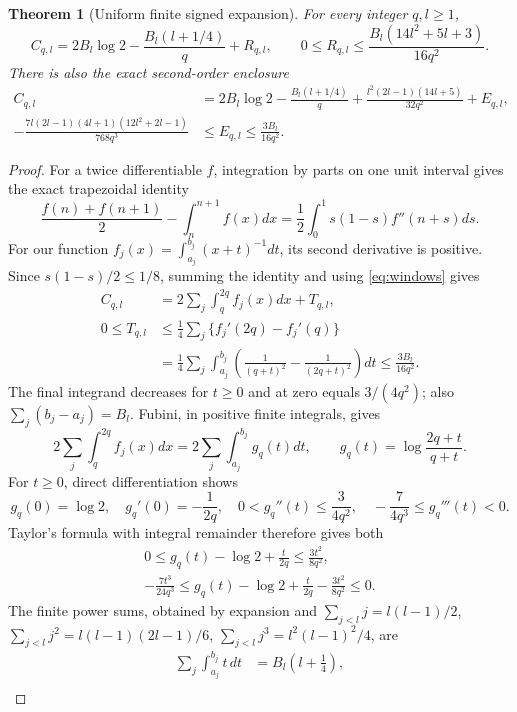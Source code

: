 \documentclass[11pt,a4paper]{article}
\newtheorem{theorem}{Theorem}
\begin{document}
\begin{theorem}[Uniform finite signed expansion]\label{thm:expansion}
For every integer $q,l\ge1$,
\begin{equation}\label{eq:first}
 C_{q,l}=2B_l\log2-\frac{B_l(l+1/4)}q+R_{q,l},\qquad
 0\le R_{q,l}\le\frac{B_l(14l^2+5l+3)}{16q^2}.
\end{equation}
There is also the exact second-order enclosure
\begin{align}
 C_{q,l}
 &=2B_l\log2-\frac{B_l(l+1/4)}q
  +\frac{l^2(2l-1)(14l+5)}{32q^2}+E_{q,l},\label{eq:second}\\
 -\frac{7l(2l-1)(4l+1)(12l^2+2l-1)}{768q^3}
 &\le E_{q,l}\le\frac{3B_l}{16q^2}.\label{eq:error}
\end{align}
\end{theorem}
\begin{proof}
For a twice differentiable $f$, integration by parts on one unit interval
gives the exact trapezoidal identity
\[
 \frac{f(n)+f(n+1)}2-\int_n^{n+1}f(x)dx
 =\frac12\int_0^1s(1-s)f''(n+s)ds.
\]
For our function
$f_j(x)=\int_{a_j}^{b_j}(x+t)^{-1}dt$, its second derivative is positive.
Since $s(1-s)/2\le1/8$, summing the identity and using
\eqref{eq:windows} gives
\begin{align*}
 C_{q,l}&=2\sum_j\int_q^{2q}f_j(x)dx+T_{q,l},\\
 0\le T_{q,l}
 &\le\frac14\sum_j\{f_j'(2q)-f_j'(q)\}\\
 &=\frac14\sum_j\int_{a_j}^{b_j}
                  \left(\frac1{(q+t)^2}-\frac1{(2q+t)^2}\right)dt
 \le\frac{3B_l}{16q^2}.
\end{align*}
The final integrand decreases for $t\ge0$ and at zero equals $3/(4q^2)$;
also $\sum_j(b_j-a_j)=B_l$. Fubini, in positive finite integrals, gives
\[
 2\sum_j\int_q^{2q}f_j(x)dx
 =2\sum_j\int_{a_j}^{b_j}g_q(t)dt,
 \qquad g_q(t)=\log\frac{2q+t}{q+t}.
\]
For $t\ge0$, direct differentiation shows
\[
 g_q(0)=\log2,\quad g_q'(0)=-\frac1{2q},\quad
 0<g_q''(t)\le\frac3{4q^2},\quad
 -\frac7{4q^3}\le g_q'''(t)<0.
\]
Taylor's formula with integral remainder therefore gives both
\begin{gather*}
 0\le g_q(t)-\log2+\frac{t}{2q}\le\frac{3t^2}{8q^2},\\
 -\frac{7t^3}{24q^3}
 \le g_q(t)-\log2+\frac{t}{2q}-\frac{3t^2}{8q^2}\le0.
\end{gather*}
The finite power sums, obtained by expansion and
$\sum_{j<l}j=l(l-1)/2$, $\sum_{j<l}j^2=l(l-1)(2l-1)/6$,
$\sum_{j<l}j^3=l^2(l-1)^2/4$, are
\begin{align*}
 \sum_j\int_{a_j}^{b_j}t\,dt&=B_l(l+\tfrac14),\\

\end{align*}
\end{proof}
\end{document}
